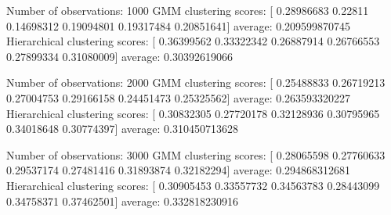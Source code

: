 Number of observations:  1000
GMM  clustering scores:
  [ 0.28986683  0.22811     0.14698312  0.19094801  0.19317484  0.20851641]
average:  0.209599870745
Hierarchical  clustering scores:
  [ 0.36399562  0.33322342  0.26887914  0.26766553  0.27899334  0.31080009]
average:  0.30392619066

Number of observations:  2000
GMM  clustering scores:
  [ 0.25488833  0.26719213  0.27004753  0.29166158  0.24451473  0.25325562]
average:  0.263593320227
Hierarchical  clustering scores:
  [ 0.30832305  0.27720178  0.32128936  0.30795965  0.34018648  0.30774397]
average:  0.310450713628

Number of observations:  3000
GMM  clustering scores:
  [ 0.28065598  0.27760633  0.29537174  0.27481416  0.31893874  0.32182294]
average:  0.294868312681
Hierarchical  clustering scores:
  [ 0.30905453  0.33557732  0.34563783  0.28443099  0.34758371  0.37462501]
average:  0.332818230916
